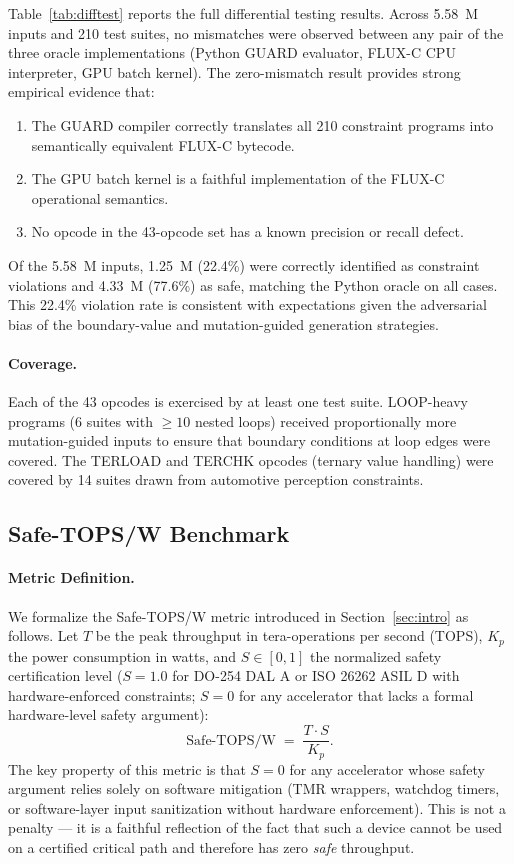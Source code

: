 \documentclass[sigplan,review,anonymous]{acmart}
\begin{document}
Table~\ref{tab:difftest} reports the full differential testing results.
Across 5.58~M inputs and 210 test suites, no mismatches were observed
between any pair of the three oracle implementations (Python GUARD
evaluator, FLUX-C CPU interpreter, GPU batch kernel).
The zero-mismatch result provides strong empirical evidence that:
\begin{enumerate}
  \item The GUARD compiler correctly translates all 210 constraint programs
        into semantically equivalent FLUX-C bytecode.
  \item The GPU batch kernel is a faithful implementation of the FLUX-C
        operational semantics.
  \item No opcode in the 43-opcode set has a known precision or recall defect.
\end{enumerate}
Of the 5.58~M inputs, 1.25~M (22.4\%) were correctly identified as
constraint violations and 4.33~M (77.6\%) as safe, matching the Python
oracle on all cases. This 22.4\% violation rate is consistent with
expectations given the adversarial bias of the boundary-value and
mutation-guided generation strategies.

\paragraph{Coverage.}
Each of the 43 opcodes is exercised by at least one test suite.
LOOP-heavy programs (6 suites with $\ge 10$ nested loops) received
proportionally more mutation-guided inputs to ensure that boundary
conditions at loop edges were covered.
The TERLOAD and TERCHK opcodes (ternary value handling) were covered by
14 suites drawn from automotive perception constraints.

\subsection{Safe-TOPS/W Benchmark}
\label{sec:eval-safetops}

\paragraph{Metric Definition.}
We formalize the Safe-TOPS/W metric introduced in Section~\ref{sec:intro}
as follows. Let $T$ be the peak throughput in tera-operations per second
(TOPS), $K_p$ the power consumption in watts, and $S \in [0, 1]$ the
normalized safety certification level ($S = 1.0$ for DO-254 DAL A or
ISO 26262 ASIL D with hardware-enforced constraints; $S = 0$ for any
accelerator that lacks a formal hardware-level safety argument):
\[
  \text{Safe-TOPS/W} \;=\; \frac{T \cdot S}{K_p}.
\]
The key property of this metric is that $S = 0$ for any accelerator whose
safety argument relies solely on software mitigation (TMR wrappers,
watchdog timers, or software-layer input sanitization without hardware
enforcement). This is not a penalty — it is a faithful reflection of the
fact that such a device cannot be used on a certified critical path and
therefore has zero \emph{safe} throughput.
\end{document}
